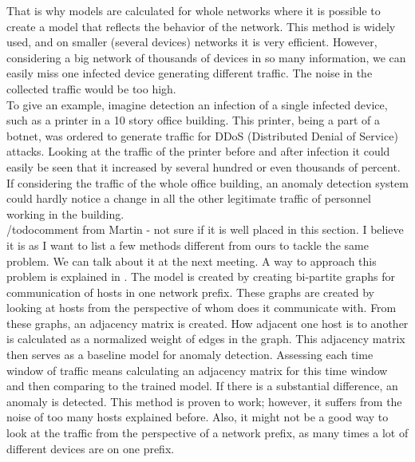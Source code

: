 \documentclass[thesis=B,english]{FITthesis}[2012/10/20]
\begin{document}
That is why models are calculated for whole networks where it is possible to create a model that reflects the behavior of the network.
This method is widely used, and on smaller (several devices) networks it is very efficient.
However, considering a big network of thousands of devices in so many information, we can easily miss one infected device generating different traffic.
The noise in the collected traffic would be too high. \\                          
                                                                                  
To give an example, imagine detection an infection of a single infected device, such as a printer in a 10 story office building.
This printer, being a part of a botnet, was ordered to generate traffic for DDoS (Distributed Denial of Service) attacks.
Looking at the traffic of the printer before and after infection it could easily be seen that it increased by several hundred or even thousands of percent.
If considering the traffic of the whole office building, an anomaly detection system could hardly notice a change in all the other legitimate traffic of personnel working in the building. \\
                                                                                  
/todo{comment from Martin - not sure if it is well placed in this section. I believe it is as I want to list a few methods different from ours to tackle the same problem. We can talk about it at the next meeting.}      
A way to approach this problem is explained in \cite{xu2011network}.              
The model is created by creating bi-partite graphs for communication of hosts in one network prefix.
These graphs are created by looking at hosts from the perspective of whom does it communicate with.
From these graphs, an adjacency matrix is created.                                
How adjacent one host is to another is calculated as a normalized weight of edges in the graph.
This adjacency matrix then serves as a baseline model for anomaly detection.      
Assessing each time window of traffic means calculating an adjacency matrix for this time window and then comparing to the trained model.
If there is a substantial difference, an anomaly is detected.                      
This method is proven to work; however, it suffers from the noise of too many hosts explained before.
Also, it might not be a good way to look at the traffic from the perspective of a network prefix, as many times a lot of different devices are on one prefix. \\
\end{document}
